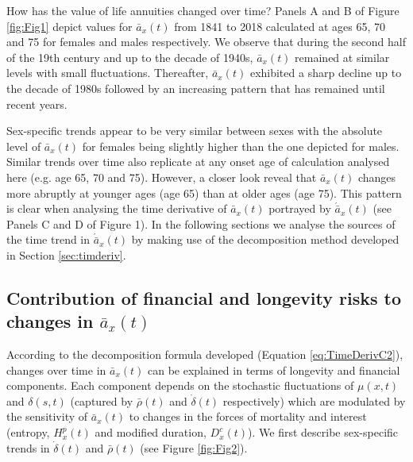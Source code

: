 \documentclass[12pt]{article}
\begin{document}
How has the value of life annuities changed over time? Panels A and B of Figure \ref{fig:Fig1} depict values for $\bar{a}_x(t)$ from 1841 to 2018 calculated at ages 65, 70 and 75 for females and males respectively. We observe that during the second half of the 19th century and up to the decade of 1940s, $\bar{a}_x(t)$ remained at similar levels with small fluctuations. Thereafter, $\bar{a}_x(t)$ exhibited a sharp decline up to the decade of 1980s followed by an increasing pattern that has remained until recent years.
  
Sex-specific trends appear to be very similar between sexes with the absolute level of $\bar{a}_x(t)$ for females being slightly higher than the one depicted for males. Similar trends over time also replicate at any onset age of calculation analysed here (e.g. age 65, 70 and 75). However, a closer look reveal that $\bar{a}_x(t)$ changes more abruptly at younger ages (age 65) than at older ages (age 75). This pattern is clear when analysing the time derivative of $\bar{a}_x(t)$ portrayed by $\acute{\bar{a}}_x(t)$  (see Panels C and D of Figure 1). In the following sections we analyse the sources of the time trend in  $\acute{\bar{a}}_x(t)$ by making use of the decomposition method developed in Section \ref{sec:timderiv}.

\subsection{Contribution of financial and longevity risks to changes in $\bar{a}_x(t)$}

According to the decomposition formula developed (Equation \ref{eq:TimeDerivC2}), changes over time in $\bar{a}_x(t)$ can be explained in terms of longevity and financial components. Each component depends on the stochastic fluctuations of $\mu(x,t)$ and $\delta(s,t)$ (captured by $\bar{\rho}(t)$ and $\dot{\delta}(t)$ respectively) which are modulated by the sensitivity of $\bar{a}_x(t)$ to changes in the forces of mortality and interest (entropy, ${H}^{p}_x(t)$ and modified duration, ${D}^{c}_x(t)$). We first describe sex-specific trends in $\dot{\delta}(t)$ and $\bar{\rho}(t)$ (see Figure \ref{fig:Fig2}). 
\end{document}
